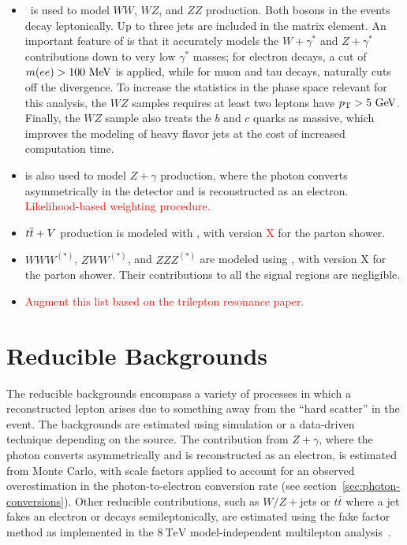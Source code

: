 \begin{itemize}
	\item \sherpa\ is used to model $WW$, $WZ$, and $ZZ$ production. Both bosons in the events decay leptonically. Up to three jets are included in the matrix element. An important feature of \sherpa is that it accurately models the $W+\gamma^{*}$ and $Z+\gamma^{*}$ contributions down to very low $\gamma^{*}$ masses; for electron decays, a cut of $m(ee)>100 \MeV$ is applied, while for muon and tau decays, \sherpa naturally cuts off the divergence. To increase the statistics in the phase space relevant for this analysis, the $WZ$ samples requires at least two leptons have $\pt>5 \GeV$. Finally, the $WZ$ sample also treats the $b$ and $c$ quarks as massive, which improves the modeling of heavy flavor jets at the cost of increased computation time. 

	\item \sherpa is also used to model $Z+\gamma$ production, where the photon converts asymmetrically in the detector and is reconstructed as an electron. \textcolor{red}{Likelihood-based weighting procedure.}

	\item $t\overline{t}+V$ production is modeled with \madgraph, with \pythia version \textcolor{red}{X} for the parton shower. 

	\item $WWW^{(*)}$, $ZWW^{(*)}$, and $ZZZ^{(*)}$ are modeled using \madgraph, with \pythia version X for the parton shower. Their contributions to all the signal regions are negligible.

	\item \textcolor{red}{Augment this list based on the trilepton resonance paper.}
\end{itemize}


\section{Reducible Backgrounds}\label{sec:model-independent-reducible-backgrounds}
The reducible backgrounds encompass a variety of processes in which a reconstructed lepton arises due to something away from the ``hard scatter'' in the event. The backgrounds are estimated using simulation or a data-driven technique depending on the source. The contribution from $Z+\gamma$, where the photon converts asymmetrically and is reconstructed as an electron, is estimated from Monte Carlo, with scale factors applied to account for an observed overestimation in the photon-to-electron conversion rate (see section~\ref{sec:photon-conversions}). Other reducible contributions, such as $W/Z+$jets or $t\overline{t}$ where a jet fakes an electron or decays semileptonically, are estimated using the fake factor method as implemented in the $8~\mbox{TeV}$ model-independent multilepton analysis~\cite{DeViveiros:1670929}. 


